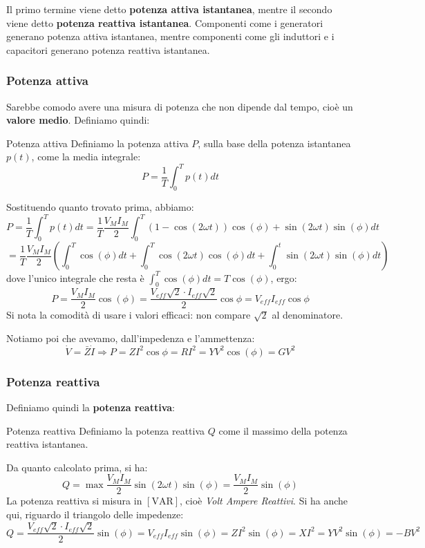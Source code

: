 \documentclass[a4paper,11pt]{article}
\begin{document}
Il primo termine viene detto \textbf{potenza attiva istantanea}, mentre il secondo viene detto \textbf{potenza reattiva istantanea}.
Componenti come i generatori generano potenza attiva istantanea, mentre componenti come gli induttori e i capacitori generano potenza reattiva istantanea.

\subsubsection{Potenza attiva}
Sarebbe comodo avere una misura di potenza che non dipende dal tempo, cioè un \textbf{valore medio}.
Definiamo quindi:
\begin{definition}{Potenza attiva}
	Definiamo la potenza attiva $P$, sulla base della potenza istantanea $p(t)$, come la media integrale:
	$$
		P = \frac{1}{T} \int_0^T p(t) dt
	$$
\end{definition}

Sostituendo quanto trovato prima, abbiamo:
$$
P = \frac{1}{T} \int_0^T p(t) dt = \frac{1}{T} \frac{V_M I_M}{2} \int_0^T \left( 1 - \cos(2\omega t) \right) \cos(\phi) +  \sin(2\omega t)\sin(\phi)  dt
$$
$$
= \frac{1}{T} \frac{V_M I_M}{2} \left( \int_0^T \cos(\phi) dt + \int_0^T \cos(2\omega t) \cos(\phi) dt + \int_0^t \sin(2\omega t)\sin(\phi)  dt \right) 
$$
dove l'unico integrale che resta è $\int_0^T \cos(\phi) dt = T \cos(\phi)$, ergo: 
$$
P= \frac{V_M I_M}{2} \cos(\phi) = \frac{V_{eff} \sqrt{2} \cdot I_{eff} \sqrt{2}}{2} \cos{\phi} = V_{eff}I_{eff} \cos{\phi}
$$
Si nota la comodità di usare i valori efficaci: non compare $\sqrt{2}$ al denominatore.

Notiamo poi che avevamo, dall'impedenza e l'ammettenza:
$$
\dot V = \bar{Z} \dot{I}  \Rightarrow P = Z I^2 \cos{\phi} = R I^2 = Y V^2 \cos(\phi) = G V^2 
$$

\subsubsection{Potenza reattiva}
Definiamo quindi la \textbf{potenza reattiva}:
\begin{definition}{Potenza reattiva}
	Definiamo la potenza reattiva $Q$ come il massimo della potenza reattiva istantanea.
\end{definition}

Da quanto calcolato prima, si ha:
$$
Q = \max{\frac{V_M I_M}{2} \sin(2\omega t)\sin(\phi)} = \frac{V_M I_M}{2} \sin(\phi)
$$
La potenza reattiva si misura in $[\mathrm{VAR}]$, cioè \textit{Volt Ampere Reattivi}.
Si ha anche qui, riguardo il triangolo delle impedenze:
$$
Q = \frac{V_{eff} \sqrt{2} \cdot I_{eff} \sqrt{2}}{2} \sin(\phi) = V_{eff}I_{eff} \sin(\phi) = ZI^2 \sin(\phi) = XI^2 = YV^2 \sin(\phi) = - BV^2
$$
\end{document}
